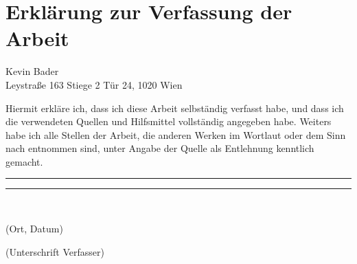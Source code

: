 \documentclass[thesis.tex]{subfiles}
\begin{document}
\chapter*{Erklärung zur Verfassung der Arbeit}

Kevin Bader\\
Leystraße 163 Stiege 2 Tür 24, 1020 Wien

\vspace{2\baselineskip}\noindent
Hiermit erkläre ich, dass ich diese Arbeit selbständig verfasst habe, und 
dass ich die verwendeten Quellen und Hilfsmittel vollständig angegeben 
habe. Weiters habe ich alle Stellen der Arbeit, die anderen Werken im 
Wortlaut oder dem Sinn nach entnommen sind, unter Angabe 
der Quelle als Entlehnung kenntlich gemacht.\\

\vspace{4\baselineskip}
\noindent
\rule{.4\textwidth}{.5pt}\hfill \rule{.4\textwidth}{.5pt}\\[0.2\baselineskip]
\parbox{.4\textwidth}{\centering\sffamily (Ort, Datum)}\hfill \parbox{.4\textwidth}{\centering\sffamily (Unterschrift Verfasser)}
\end{document}
